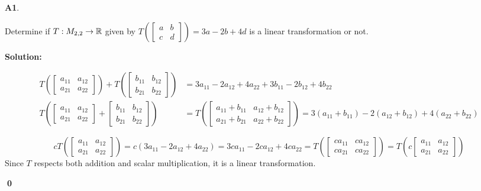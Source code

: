 \documentclass{article}
\newenvironment{problem}[1]
{
  \begin{flushleft}
  \textbf{#1}.
  \ignorespaces
}
{
  \end{flushleft}
}
\newenvironment{solution}
{
  \ignorespaces
  \textbf{Solution:}
}
{
  \ignorespacesafterend
  \begin{flushright}
  {\bfseries \qed}
  \end{flushright}
}
\begin{document}
\begin{problem}{A1}
Determine if $T: M_{2,2} \rightarrow \mathbb{R}$ given by $T\left(\begin{bmatrix} a & b \\ c & d \end{bmatrix} \right) = 3a-2b+4d$ is a linear transformation or not.
\end{problem}
\begin{solution}
\begin{align*}
	T \left(\begin{bmatrix} a_{11} & a_{12} \\ a_{21} & a_{22} \end{bmatrix} \right) + 
	T \left(\begin{bmatrix} b_{11} & b_{12} \\ b_{21} & b_{22} \end{bmatrix} \right) &= 
	3a_{11}-2a_{12}+4a_{22} + 3b_{11}-2b_{12}+4b_{22} \\ 
	T \left(\begin{bmatrix} a_{11} & a_{12} \\ a_{21} & a_{22} \end{bmatrix}  + 
	\begin{bmatrix} b_{11} & b_{12} \\ b_{21} & b_{22} \end{bmatrix} \right) &= 
	T \left(\begin{bmatrix} a_{11}+b_{11} & a_{12}+b_{12} \\ a_{21}+b_{21} & a_{22}+b_{22} \end{bmatrix} \right)= 
	3(a_{11}+b_{11})-2(a_{12}+b_{12})+4(a_{22}+b_{22})
\end{align*}

\[ 
	cT \left(\begin{bmatrix} a_{11} & a_{12} \\ a_{21} & a_{22} \end{bmatrix} \right) = 
	c\left(3a_{11}-2a_{12}+4a_{22}\right) =
	3ca_{11}-2ca_{12}+4ca_{22}= 
	T \left(\begin{bmatrix} ca_{11} & ca_{12} \\ ca_{21} & ca_{22} \end{bmatrix} \right)= 
	T \left(c\begin{bmatrix} a_{11} & a_{12} \\ a_{21} & a_{22} \end{bmatrix}\right)
\]
Since \(T\) respects both addition and scalar multiplication, it is a linear transformation.
\end{solution}
\end{document}
